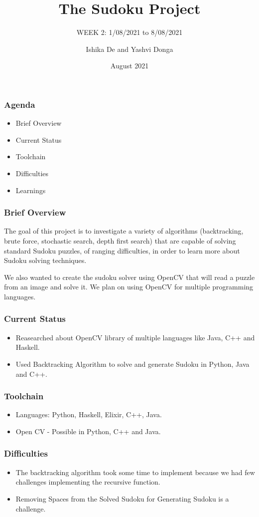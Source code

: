 \documentclass{beamer}
\title{The Sudoku Project}
\subtitle{WEEK 2: 1/08/2021 to 8/08/2021}
\author[Ishika | Yashvi]{Ishika De and Yashvi Donga}
\date{August 2021}
\begin{document}
\begin{frame}
     \titlepage
\end{frame}
\begin{frame}
     \frametitle{Agenda}
     \begin{itemize}
          \item Brief Overview
          \item Current Status
          \item Toolchain
          \item Difficulties
          \item Learnings
     \end{itemize}
\end{frame}

\begin{frame}
     \frametitle{Brief Overview}
     The goal of this project is to investigate a variety of algorithms (backtracking, brute force, stochastic search, depth first search) that are capable of solving
standard Sudoku puzzles, of ranging difficulties, in order to learn more about Sudoku
solving techniques.\newline

     We also wanted to create the sudoku solver using OpenCV that will read a puzzle from an image and solve it. We plan on using OpenCV for multiple programming languages.
\end{frame}

\begin{frame}
     \frametitle{Current Status}   
     \begin{itemize}
		  \item Reasearched about OpenCV library of multiple languages like Java, C++ and Haskell.
 		  \item Used Backtracking Algorithm to solve and generate Sudoku in Python, Java and C++. 
	 \end{itemize}
\end{frame}


\begin{frame}
     \frametitle{Toolchain}
     \begin{itemize}
          \item Languages: Python, Haskell, Elixir, C++, Java.
          \item Open CV - Possible in Python, C++ and Java.
     \end{itemize}
\end{frame}

\begin{frame}
     \frametitle{Difficulties}
     \begin{itemize}
          \item The backtracking algorithm took some time to implement because we had few challenges implementing the recursive function.
		  \item Removing Spaces from the Solved Sudoku for Generating Sudoku is a challenge. 
\end{itemize}
\end{frame}
\end{document}
